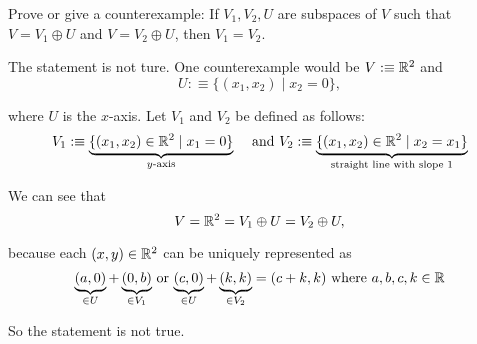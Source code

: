 \setcounter{xrcscount}{22}
\begin{xrcs}
  Prove or give a counterexample: If $V_1, V_2, U$ are subspaces of $V$ such that $V=V_1 \oplus U$ and $V=V_2 \oplus U$, then $V_1 = V_2$.

  \begin{xsol}
    The statement is not ture. One counterexample would be $V :\equiv \mathbb{R}^2$ and
    \begin{equation}
      U :\equiv \{ (x_1, x_2) \mid x_2=0 \},
    \end{equation}

    where $U$ is the $x$-axis. Let $V_1$ and $V_2$ be defined as follows:
    \[
      V_1 :\equiv \underbrace{\{(x_1, x_2) \in \real^2 \mid x_1 = 0 \}}_{\text{$y$-axis}} \quad $ and $
      V_2 :\equiv \underbrace{\{ (x_1, x_2) \in \real^2 \mid x_2 = x_1 \}}_{\text{straight line with slope $1$}}
    \]

    We can see that
    \begin{equation}
      V=\mathbb{R}^2=V_1 \oplus U = V_2 \oplus U,
    \end{equation}

    because each $(x,y)\in \mathbb{R}^2$ can be uniquely represented as \begin{equation}
      \underbrace{(a,0)}_{\in U}+\underbrace{(0,b)}_{\in V_1}$ or $\underbrace{(c,0)}_{\in U}+\underbrace{(k,k)}_{\in V_2}=(c+k,k)$ where $a,b,c,k \in \real
    \end{equation}

    So the statement is not true.
  \end{xsol}
\end{xrcs}